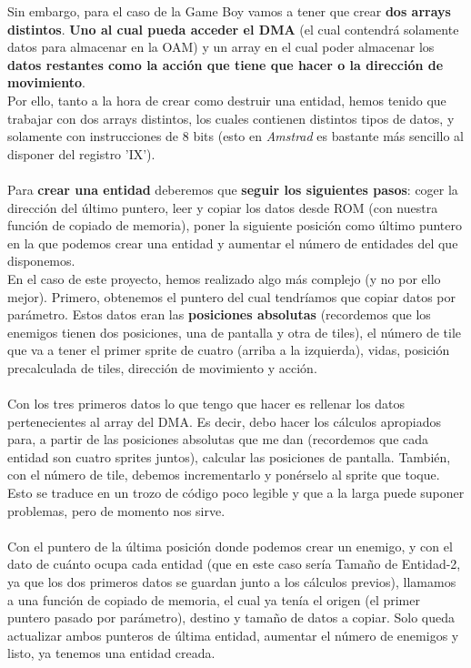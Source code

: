 Sin embargo, para el caso de la Game Boy vamos a tener que crear \textbf{dos arrays distintos}. \textbf{Uno al cual pueda acceder el DMA} (el cual contendrá solamente datos para almacenar en la OAM) y un array en el cual poder almacenar los \textbf{datos restantes como la acción que tiene que hacer o la dirección de movimiento}.
\\
Por ello, tanto a la hora de crear como destruir una entidad, hemos tenido que trabajar con dos arrays distintos, los cuales contienen distintos tipos de datos, y solamente con instrucciones de 8 bits (esto en \textit{Amstrad} es bastante más sencillo al disponer del registro 'IX').
\\ \\
Para \textbf{crear una entidad} deberemos que \textbf{seguir los siguientes pasos}: coger la dirección del último puntero, leer y copiar los datos desde ROM (con nuestra función de copiado de memoria), poner la siguiente posición como último puntero en la que podemos crear una entidad y aumentar el número de entidades del que disponemos.
\\
En el caso de este proyecto, hemos realizado algo más complejo (y no por ello mejor). Primero, obtenemos el puntero del cual tendríamos que copiar datos por parámetro. Estos datos eran las \textbf{posiciones absolutas} (recordemos que los enemigos tienen dos posiciones, una de pantalla y otra de tiles), el número de tile que va a tener el primer sprite de cuatro (arriba a la izquierda), vidas, posición precalculada de tiles, dirección de movimiento y acción. 
\\ \\
Con los tres primeros datos lo que tengo que hacer es rellenar los datos pertenecientes al array del DMA. Es decir, debo hacer los cálculos apropiados para, a partir de las posiciones absolutas que me dan (recordemos que cada entidad son cuatro sprites juntos), calcular las posiciones de pantalla. También, con el número de tile, debemos incrementarlo y ponérselo al sprite que toque. Esto se traduce en un trozo de código poco legible y que a la larga puede suponer problemas, pero de momento nos sirve.
\\ \\
Con el puntero de la última posición donde podemos crear un enemigo, y con el dato de cuánto ocupa cada entidad (que en este caso sería Tamaño de Entidad-2, ya que los dos primeros datos se guardan junto a los cálculos previos), llamamos a una función de copiado de memoria, el cual ya tenía el origen (el primer puntero pasado por parámetro), destino y tamaño de datos a copiar. Solo queda actualizar ambos punteros de última entidad, aumentar el número de enemigos y listo, ya tenemos una entidad creada.
